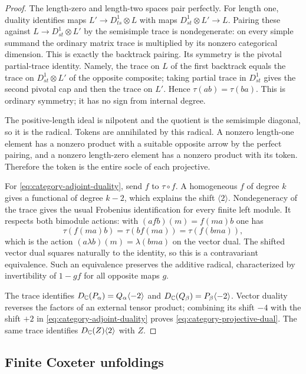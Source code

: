 \begin{proof}
The length-zero and length-two spaces pair perfectly. For length one,
duality identifies maps $L'\to D^1_{ts}\otimes L$ with maps
$D^1_{st}\otimes L'\to L$. Pairing these against
$L\to D^1_{st}\otimes L'$ by the semisimple trace is nondegenerate:
on every simple summand the ordinary matrix trace is multiplied by its
nonzero categorical dimension. This is exactly the backtrack pairing.
Its symmetry is the pivotal partial-trace identity. Namely, the trace
on $L$ of the first backtrack equals the trace on
$D^1_{st}\otimes L'$ of the opposite composite; taking partial trace
in $D^1_{st}$ gives the second pivotal cap and then the trace on $L'$.
Hence $\tau(ab)=\tau(ba)$. This is ordinary symmetry; it has no sign
from internal degree.

The positive-length ideal is nilpotent and the quotient is the
semisimple diagonal, so it is the radical. Tokens are annihilated by
this radical. A nonzero length-one element has a nonzero product with
a suitable opposite arrow by the perfect pairing, and a nonzero
length-zero element has a nonzero product with its token. Therefore
the token is the entire socle of each projective.

For \eqref{eq:category-adjoint-duality}, send $f$ to $\tau\circ f$.
A homogeneous $f$ of degree $k$ gives a functional of degree $k-2$,
which explains the shift $\langle2\rangle$. Nondegeneracy of the trace
gives the usual Frobenius identification for every finite left module.
It respects both bimodule actions: with
$(a f b)(m)=f(ma)b$ one has
\[
 \tau(f(ma)b)=\tau(bf(ma))=\tau(f(bma)),
\]
which is the action $(a\lambda b)(m)=\lambda(bma)$ on the vector dual.
The shifted vector dual squares naturally to the identity, so this is
a contravariant equivalence. Such an equivalence preserves the
additive radical, characterized by invertibility of $1-gf$ for all
opposite maps $g$.

The trace identifies
$D_\mathbb C(P_\alpha)=Q_\alpha\langle-2\rangle$ and
$D_\mathbb C(Q_\beta)=P_\beta\langle-2\rangle$. Vector duality reverses
the factors of an external tensor product; combining its shift $-4$
with the shift $+2$ in \eqref{eq:category-adjoint-duality} proves
\eqref{eq:category-projective-dual}. The same trace identifies
$D_\mathbb C(Z)\langle2\rangle$ with $Z$.
\end{proof}

\subsection{Finite Coxeter unfoldings}

